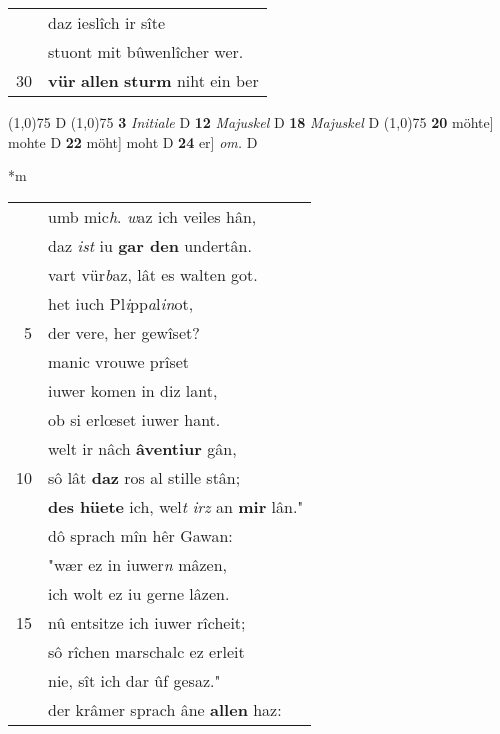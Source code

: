 \documentclass[8pt,a4paper,notitlepage]{article}
\begin{document}
\begin{table}[ht]
\begin{minipage}[t]{0.5\linewidth}
\begin{tabular}{rl}
 & daz ieslîch ir sîte\\ 
 & stuont mit bûwenlîcher wer.\\ 
30 & \textbf{vür} \textbf{allen} \textbf{sturm} niht ein ber\\ 
\end{tabular}
\scriptsize
\line(1,0){75} \newline
D \newline
\line(1,0){75} \newline
\textbf{3} \textit{Initiale} D  \textbf{12} \textit{Majuskel} D  \textbf{18} \textit{Majuskel} D  \newline
\line(1,0){75} \newline
\textbf{20} möhte] mohte D \textbf{22} möht] moht D \textbf{24} er] \textit{om.} D \newline
\end{minipage}
\hspace{0.5cm}
\begin{minipage}[t]{0.5\linewidth}
\small
\begin{center}*m
\end{center}
\begin{tabular}{rl}
 & umb mic\textit{h}. \textit{w}az ich veiles hân,\\ 
 & daz \textit{ist} iu \textbf{gar den} undertân.\\ 
 & vart vür\textit{b}az, lât es walten got.\\ 
 & het iuch Pl\textit{i}pp\textit{a}l\textit{in}ot,\\ 
5 & der vere, her gewîset?\\ 
 & manic vrouwe prîset\\ 
 & iuwer komen in diz lant,\\ 
 & ob si erlœset iuwer hant.\\ 
 & welt ir nâch \textbf{âventiur} gân,\\ 
10 & sô lât \textbf{daz} ros al stille stân;\\ 
 & \textbf{des hüete} ich, wel\textit{t} \textit{irz} an \textbf{mir} lân."\\ 
 & dô sprach mîn hêr Gawan:\\ 
 & "wær ez in iuwer\textit{n} mâzen,\\ 
 & ich wolt ez iu gerne lâzen.\\ 
15 & nû entsitze ich iuwer rîcheit;\\ 
 & sô rîchen marschalc ez erleit\\ 
 & nie, sît ich dar ûf gesaz."\\ 
 & der krâmer sprach âne \textbf{allen} haz:\\ 

\end{tabular}
\end{minipage}
\end{table}
\end{document}
